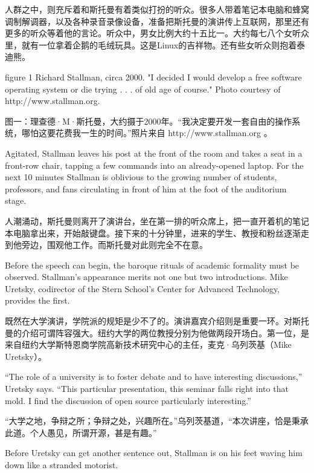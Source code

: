 \ifdefined\chs
人群之中，则充斥着和斯托曼有着类似打扮的听众。很多人带着笔记本电脑和蜂窝调制解调器，以及各种录音录像设备，准备把斯托曼的演讲传上互联网，那里还有更多的听众等着他的言论。听众中，男女比例大约十五比一。大约每七八个女听众里，就有一位拿着企鹅的毛绒玩具。这是Linux的吉祥物。还有些女听众则抱着泰迪熊。
\fi

\ifdefined\eng
figure 1
Richard Stallman, circa 2000. "I decided I would develop a free software operating system or die trying . . . of old age of course." Photo courtesy of http://www.stallman.org.
\fi

\ifdefined\chs
图一：理查德·M·斯托曼，大约摄于2000年。“我决定要开发一套自由的操作系统，哪怕这要花费我一生的时间。”照片来自 http://www.stallman.org 。
\fi

\ifdefined\eng
Agitated, Stallman leaves his post at the front of the room and takes a seat in a front-row chair, tapping a few commands into an already-opened laptop. For the next 10 minutes Stallman is oblivious to the growing number of students, professors, and fans circulating in front of him at the foot of the auditorium stage.
\fi

\ifdefined\chs
人潮涌动，斯托曼则离开了演讲台，坐在第一排的听众席上，把一直开着机的笔记本电脑拿出来，开始敲键盘。接下来的十分钟里，进来的学生、教授和粉丝逐渐走到他旁边，围观他工作。而斯托曼对此则完全不在意。
\fi

\ifdefined\eng
Before the speech can begin, the baroque rituals of academic formality must be observed. Stallman's appearance merits not one but two introductions. Mike Uretsky, codirector of the Stern School's Center for Advanced Technology, provides the first.
\fi

\ifdefined\chs
既然在大学演讲，学院派的规矩是少不了的。演讲嘉宾介绍则是重要一环。对斯托曼的介绍可谓阵容强大。纽约大学的两位教授分别为他做两段开场白。第一位，是来自纽约大学斯特恩商学院高新技术研究中心的主任，麦克·乌列茨基（Mike Uretsky）。
\fi

\ifdefined\eng
``The role of a university is to foster debate and to have interesting discussions,'' Uretsky says. ``This particular presentation, this seminar falls right into that mold. I find the discussion of open source particularly interesting.''
\fi

\ifdefined\chs
``大学之地，争辩之所；争辩之处，兴趣所在。''乌列茨基道，``本次讲座，恰是秉承此道。个人愚见，所谓开源，甚是有趣。''
\fi

\ifdefined\eng
Before Uretsky can get another sentence out, Stallman is on his feet waving him down like a stranded motorist.
\fi

